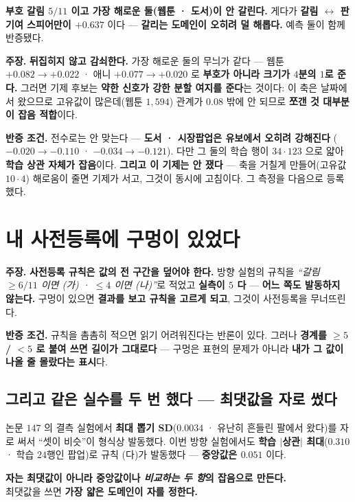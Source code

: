 \documentclass[10pt,a4paper]{article}
\newcommand{\claim}[2]{\begin{claimbox}\textbf{주장.} #1\par\smallskip
  \textcolor{gray!70}{\textbf{반증 조건.} #2}\end{claimbox}}
\begin{document}
\textbf{부호 갈림 $5/11$ 이고 가장 해로운 둘(웹툰 · 도서)이 안 갈린다.} 게다가
\textbf{갈림 $\leftrightarrow$ 판 기여 스피어만이 $+0.637$} 이다 --- \textbf{갈리는
도메인이 오히려 덜 해롭다.} 예측 둘이 함께 반증됐다.

\claim{\textbf{뒤집히지 않고 감쇠한다.} 가장 해로운 둘의 무늬가 같다 --- 웹툰
$+0.082 \to +0.022$ · 애니 $+0.077 \to +0.020$ 로 \textbf{부호가 아니라 크기가
$4$분의 $1$로 준다.} 그러면 기제 후보는 \textbf{약한 신호가 강한 분할 여지를
준다}는 것이다: 이 축은 날짜에서 왔으므로 고유값이 많은데(웹툰 $1{,}594$) 관계가
$0.08$ 밖에 안 되므로 \textbf{쪼갠 것 대부분이 잡음 적합}이다.}
{전수로는 안 맞는다 --- \textbf{도서 · 시장팝업은 유보에서 오히려 강해진다}
($-0.020 \to -0.110$ · $-0.034 \to -0.121$). 다만 그 둘의 학습 행이 $34 \cdot 123$
으로 얇아 \textbf{학습 상관 자체가 잡음}이다. \textbf{그리고 이 기제는 안 쟀다} ---
축을 거칠게 만들어(고유값 $10 \cdot 4$) 해로움이 줄면 기제가 서고, 그것이 동시에
고침이다. 그 측정을 다음으로 등록했다.}

\section{내 사전등록에 구멍이 있었다}

\claim{\textbf{사전등록 규칙은 값의 전 구간을 덮어야 한다.} 방향 실험의 규칙을
\emph{``갈림 $\geq 6/11$ 이면 (가) · $\leq 4$ 이면 (나)''}로 적었고 \textbf{실측이
$5$ 다} --- \textbf{어느 쪽도 발동하지 않는다.} 구멍이 있으면 \textbf{결과를 보고
규칙을 고르게 되고}, 그것이 사전등록을 무너뜨린다.}
{규칙을 촘촘히 적으면 읽기 어려워진다는 반론이 있다. 그러나 \textbf{경계를
$\geq 5$ / $< 5$ 로 붙여 쓰면 길이가 그대로다} --- 구멍은 표현의 문제가 아니라
\textbf{내가 그 값이 나올 줄 몰랐다는 표시}다.}

\subsection*{그리고 같은 실수를 두 번 했다 --- 최댓값을 자로 썼다}

논문 $147$ 의 결측 실험에서 \textbf{최대 뽑기 SD}($0.0034$ · 유난히 흔들린 팔에서 왔다)를
자로 써서 ``셋이 비슷''이 형식상 발동했다. 이번 방향 실험에서도 \textbf{학습 $|$상관$|$
최대}($0.310$ · 학습 $24$행인 팝업)로 규칙 (다)가 발동했다 --- \textbf{중앙값은
$0.051$} 이다.

\begin{center}
\textbf{자는 최댓값이 아니라 중앙값이나 \emph{비교하는 두 항}의 잡음으로 만든다.}\\
최댓값을 쓰면 \textbf{가장 얇은 도메인이 자를 정한다.}
\end{center}
\end{document}
